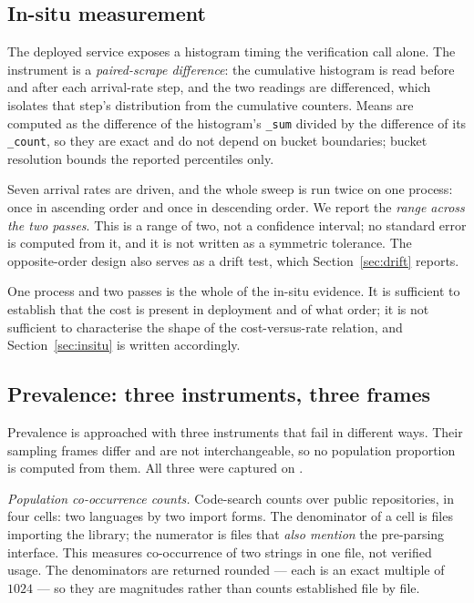 \documentclass[pdflatex,sn-basic,twocolumn]{sn-jnl}%
\begin{document}
\subsection{In-situ measurement}\label{sec:insitu-method}

The deployed service exposes a histogram timing the verification call alone. The
instrument is a \emph{paired-scrape difference}: the cumulative histogram is read
before and after each arrival-rate step, and the two readings are differenced,
which isolates that step's distribution from the cumulative counters. Means are
computed as the difference of the histogram's \texttt{\_sum} divided by the
difference of its \texttt{\_count}, so they are exact and do not depend on bucket
boundaries; bucket resolution bounds the reported percentiles only.

Seven arrival rates are driven, and the whole sweep is run twice on one process:
once in ascending order and once in descending order. We report the \emph{range
across the two passes}. This is a range of two, not a confidence interval; no
standard error is computed from it, and it is not written as a symmetric
tolerance. The opposite-order design also serves as a drift test, which
Section~\ref{sec:drift} reports.

One process and two passes is the whole of the in-situ evidence. It is sufficient
to establish that the cost is present in deployment and of what order; it is not
sufficient to characterise the shape of the cost-versus-rate relation, and
Section~\ref{sec:insitu} is written accordingly.

\subsection{Prevalence: three instruments, three frames}\label{sec:frames}

Prevalence is approached with three instruments that fail in different ways.
Their sampling frames differ and are not interchangeable, so no population
proportion is computed from them. All three were captured on \PopCapturedAt.

\emph{Population co-occurrence counts.} Code-search counts over public
repositories, in four cells: two languages by two import forms. The denominator
of a cell is files importing the library; the numerator is files that \emph{also
mention} the pre-parsing interface. This measures co-occurrence of two strings in
one file, not verified usage. The denominators are returned rounded --- each is
an exact multiple of $1024$ --- so they are magnitudes rather than counts
established file by file.
\end{document}
